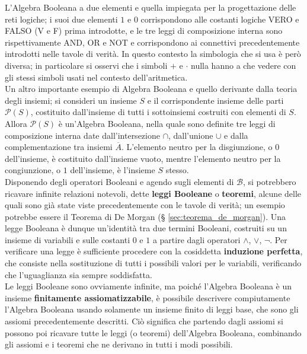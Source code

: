 \documentclass[a4paper]{extarticle}
\begin{document}
\noindent
L’Algebra Booleana a due elementi e quella impiegata per la progettazione delle reti logiche; i suoi due elementi \(1\) e \(0\) corrispondono alle costanti logiche VERO e FALSO (V e F) prima introdotte, e le tre leggi di composizione interna sono rispettivamente AND, OR e NOT e corrispondono ai connettivi precedentemente introdotti nelle tavole di verità. In questo contesto la simbologia che si usa è però diversa; in particolare si osservi che i simboli \(+\) e \(\cdot\) nulla hanno a che vedere con gli stessi simboli usati nel contesto dell’aritmetica.\\
Un altro importante esempio di Algebra Booleana e quello derivante dalla teoria degli insiemi; si consideri un insieme \(S\) e il corrispondente insieme delle parti \(\mathcal{P}(S)\), costituito dall’insieme di tutti i sottoinsiemi costruiti con elementi di \(S\). Allora \(\mathcal{P}(S)\) è un'Algebra Booleana, nella quale sono definite tre leggi di composizione interna date dall’intersezione \(\cap\), dall’unione \(\cup\) e dalla complementazione tra insiemi \(\overline{A}\). L’elemento neutro per la disgiunzione, o \(0\) dell’insieme, è costituito dall’insieme vuoto, mentre l’elemento neutro per la congiunzione, o \(1\) dell’insieme, è l’insieme \(S\) stesso.\\
Disponendo degli operatori Booleani e agendo sugli elementi di \(\mathcal{B}\), si potrebbero ricavare infinite relazioni notevoli, dette \textbf{leggi Booleane} o \textbf{teoremi}, alcune delle quali sono già state viste precedentemente con le tavole di verità; un esempio potrebbe essere il Teorema di De Morgan (§ \ref{sec:teorema_de_morgan}). Una legge Booleana è dunque un’identità tra due termini Booleani, costruiti su un insieme di variabili e sulle costanti \(0\) e \(1\) a partire dagli operatori \(\wedge\), \(\vee\), \(\neg\). Per verificare una legge è sufficiente procedere con la cosiddetta \textbf{induzione perfetta}, che consiste nella sostituzione di tutti i possibili valori per le variabili, verificando che l’uguaglianza sia sempre soddisfatta.\\
Le leggi Booleane sono ovviamente infinite, ma poiché l’Algebra Booleana è un insieme \textbf{finitamente assiomatizzabile}, è possibile descrivere compiutamente l’Algebra Booleana usando solamente un insieme finito di leggi base, che sono gli assiomi precedentemente descritti. Ciò significa che partendo dagli assiomi si possono poi ricavare tutte le leggi (o teoremi) dell’Algebra Booleana, combinando gli assiomi e i teoremi che ne derivano in tutti i modi possibili.\\
\end{document}
